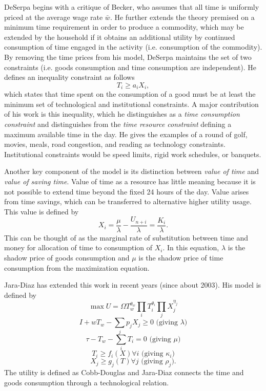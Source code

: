 DeSerpa begins with a critique of Becker, who assumes that all time is uniformly priced at the average wage rate $\bar{w}$. He further extends the theory premised on a minimum time requirement in order to produce a commodity, which may be extended by the household if it obtains an additional utility by continued consumption of time engaged in the activity (i.e. consumption of the commodity). By removing the time prices from his model, DeSerpa maintains the set of two constraints (i.e. goods consumption and time consumption are independent). He defines an inequality constraint as follows
\begin{equation}
	T_i \geq a_i X_i,
\end{equation}
which states that time spent on the consumption of a good must be at least the minimum set of technological and institutional constraints. A major contribution of his work is this inequality, which he distinguishes as a \emph{time consumption constraint} and distinguishes from the \emph{time resource constraint} defining a maximum available time in the day. He gives the examples of a round of golf, movies, meals, road congestion, and reading as technology constraints. Institutional constraints would be speed limits, rigid work schedules, or banquets.

Another key component of the model is its distinction between \emph{value of time} and \emph{value of saving time}. Value of time as a resource has little meaning because it is not possible to extend time beyond the fixed 24 hours of the day. Value arises from time savings, which can be transferred to alternative higher utility usage. This value is defined by
\begin{equation}
	X_i = \frac{\mu}{\lambda} - \frac{U_{n+i}}{\lambda} = \frac{K_i}{\lambda}.
\end{equation}
This can be thought of as the marginal rate of substitution between time and money for allocation of time to consumption of $X_i$. In this equation, $\lambda$ is the shadow price of goods consumption and $\mu$ is the shadow price of time consumption from the maximization equation.

Jara-Diaz has extended this work in recent years (since about 2003). His model is defined by
\begin{equation}
	\max U = \Omega T_w^{\theta_w} \prod_i T_i^{\theta_i} \prod_j X_j^{\eta_j}
\end{equation}
\begin{equation}
	I + wT_w - \sum_j p_j X_j \geq 0 \text{ (giving } \lambda)
\end{equation}
\begin{equation}
	\tau - T_w - \sum_i T_i = 0 \text{ (giving } \mu)
\end{equation}
\begin{equation}
	T_i \geq f_i(X) \forall i \text{ (giving } \kappa_i)
\end{equation}
\begin{equation}
	X_j \geq g_j(T) \forall j \text{ (giving } \rho_j) .
\end{equation}
The utility is defined as Cobb-Douglas and Jara-Diaz connects the time and goods consumption through a technological relation.

